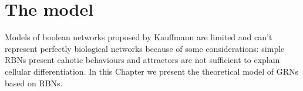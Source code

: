 %

%
%
%
%
%
\chapter{The model}\label{model}
\lhead[\fancyplain{}{\bfseries\thepage}]{\fancyplain{}{\bfseries\rightmark}}
Models of boolean networks proposed by Kauffmann are limited and can't represent perfectly biological networks because of some considerations: simple RBNs present cahotic behaviours and attractors are not sufficient to explain cellular differentiation.
In this Chapter we present the theoretical model of GRNs based on RBNs.

